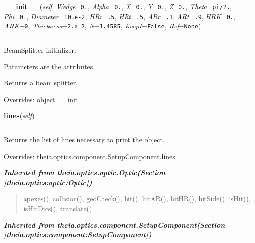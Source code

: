 \hspace{.8\funcindent}\begin{boxedminipage}{\funcwidth}

    \raggedright \textbf{\_\_init\_\_}(\textit{self}, \textit{Wedge}={\tt 0.}, \textit{Alpha}={\tt 0.}, \textit{X}={\tt 0.}, \textit{Y}={\tt 0.}, \textit{Z}={\tt 0.}, \textit{Theta}={\tt pi/2.}, \textit{Phi}={\tt 0.}, \textit{Diameter}={\tt 10.e-2}, \textit{HRr}={\tt .5}, \textit{HRt}={\tt .5}, \textit{ARr}={\tt .1}, \textit{ARt}={\tt .9}, \textit{HRK}={\tt 0.}, \textit{ARK}={\tt 0}, \textit{Thickness}={\tt 2.e-2}, \textit{N}={\tt 1.4585}, \textit{KeepI}={\tt False}, \textit{Ref}={\tt None})

    \vspace{-1.5ex}

    \rule{\textwidth}{0.5\fboxrule}
\setlength{\parskip}{2ex}
    BeamSplitter initializer.

    Parameters are the attributes.

    Returns a beam splitter.

\setlength{\parskip}{1ex}
      Overrides: object.\_\_init\_\_

    \end{boxedminipage}

    \vspace{0.5ex}

\hspace{.8\funcindent}\begin{boxedminipage}{\funcwidth}

    \raggedright \textbf{lines}(\textit{self})

    \vspace{-1.5ex}

    \rule{\textwidth}{0.5\fboxrule}
\setlength{\parskip}{2ex}
    Returns the list of lines necessary to print the object.

\setlength{\parskip}{1ex}
      Overrides: theia.optics.component.SetupComponent.lines

    \end{boxedminipage}


\large{\textbf{\textit{Inherited from theia.optics.optic.Optic\textit{(Section \ref{theia:optics:optic:Optic})}}}}

\begin{quote}
apexes(), collision(), geoCheck(), hit(), hitAR(), hitHR(), hitSide(), isHit(), isHitDics(), translate()
\end{quote}

\large{\textbf{\textit{Inherited from theia.optics.component.SetupComponent\textit{(Section \ref{theia:optics:component:SetupComponent})}}}}

